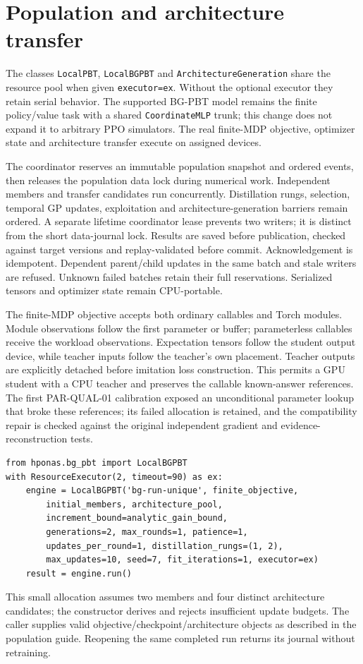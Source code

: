 \section{Population and architecture transfer}
The classes \texttt{LocalPBT}, \texttt{LocalBGPBT} and \texttt{ArchitectureGeneration} share the resource pool when given \texttt{executor=ex}.
Without the optional executor they retain serial behavior. The supported
BG-PBT model remains the finite policy/value task with a shared
\texttt{CoordinateMLP} trunk; this change does not expand it to arbitrary PPO
simulators. The real finite-MDP objective, optimizer state and architecture
transfer execute on assigned devices.

The coordinator reserves an immutable population snapshot and ordered events,
then releases the population data lock during numerical work. Independent
members and transfer candidates run concurrently. Distillation rungs,
selection, temporal GP updates, exploitation and architecture-generation
barriers remain ordered. A separate lifetime coordinator lease prevents two
writers; it is distinct from the short data-journal lock. Results are saved
before publication, checked against target versions and replay-validated before
commit. Acknowledgement is idempotent. Dependent parent/child updates in the
same batch and stale writers are refused. Unknown failed batches retain their
full reservations. Serialized tensors and optimizer state remain CPU-portable.

The finite-MDP objective accepts both ordinary callables and Torch modules.
Module observations follow the first parameter or buffer; parameterless
callables receive the workload observations. Expectation tensors follow the
student output device, while teacher inputs follow the teacher's own placement.
Teacher outputs are explicitly detached before imitation loss construction.
This permits a GPU student with a CPU teacher and preserves the callable
known-answer references. The first PAR-QUAL-01 calibration exposed an
unconditional parameter lookup that broke these references; its failed
allocation is retained, and the compatibility repair is checked against the
original independent gradient and evidence-reconstruction tests.

\begin{Verbatim}[fontsize=\small]
from hponas.bg_pbt import LocalBGPBT
with ResourceExecutor(2, timeout=90) as ex:
    engine = LocalBGPBT('bg-run-unique', finite_objective,
        initial_members, architecture_pool,
        increment_bound=analytic_gain_bound,
        generations=2, max_rounds=1, patience=1,
        updates_per_round=1, distillation_rungs=(1, 2),
        max_updates=10, seed=7, fit_iterations=1, executor=ex)
    result = engine.run()
\end{Verbatim}
This small allocation assumes two members and four distinct architecture
candidates; the constructor derives and rejects insufficient update budgets.
The caller supplies valid objective/checkpoint/architecture objects as described
in the population guide. Reopening the same completed run returns its journal
without retraining.

